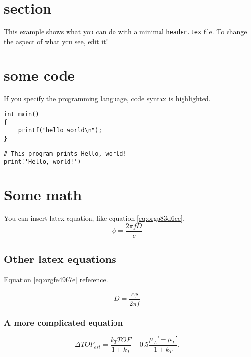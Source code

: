 


\maketitle

\newpage

\section{section}
\label{sec:org50dbda3}
This example shows what you can do with a minimal \texttt{header.tex} file.
To change the aspect of what you see, edit it!

\section{some code}
\label{sec:org31e2d7c}
If you specify the programming language, code syntax is highlighted.
\begin{verbatim}
int main()
{
    printf("hello world\n");
}
\end{verbatim}

\begin{verbatim}
# This program prints Hello, world!
print('Hello, world!')
\end{verbatim}

\section{Some math}
\label{sec:org24cddeb}
You can insert latex equation, like equation \ref{eq:orga83d6cc}.
\begin{equation}
\label{eq:orga83d6cc}
\phi = \frac{2\pi fD}{c}
\end{equation}
\subsection{Other latex equations}
\label{sec:org944ef01}
Equation \ref{eq:orgfe4967e} reference.

\begin{equation}
\label{eq:orgfe4967e}
D = \frac{c\phi}{2\pi f}
\end{equation}

\subsubsection{A more complicated equation}
\label{sec:orge7dced9}

\begin{equation}
\Delta TOF_{est} = \frac{k_T TOF}{1+k_T } - 0.5 \frac{\mu_A' - \mu_T'}{1+k_T}.
\end{equation}

